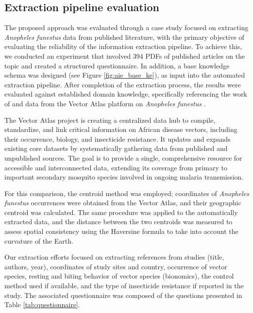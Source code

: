 \documentclass{article}
\begin{document}
\subsection{Extraction pipeline evaluation}
\par 
The proposed approach was evaluated through a case study focused on extracting \textit{Anopheles funestus} data from published literature, with the primary objective of evaluating the reliability of the information extraction pipeline. 
To achieve this, we conducted an experiment that involved 394 PDFs of published articles on the topic and created a structured questionnaire. 
In addition, a base knowledge schema was designed (see Figure \ref{fig:aie_base_ke}), as input into the automated extraction pipeline. 
After completion of the extraction process, the results were evaluated against established domain knowledge, specifically referencing the work of \citep{2012.ME.AGM} and data from the Vector Atlas platform on \textit{Anopheles funestus} \citep{2025.VE.VAP}. 
\par
The Vector Atlas project is creating a centralized data hub to compile, standardize, and link critical information on African disease vectors, including their occurrence, biology, and insecticide resistance. It updates and expands existing core datasets by systematically gathering data from published and unpublished sources. 
The goal is to provide a single, comprehensive resource for accessible and interconnected data, extending its coverage from primary to important secondary mosquito species involved in ongoing malaria transmission.
\par
For this comparison, the centroid method was employed; coordinates of \textit{Anopheles funestus} occurrences were obtained from the Vector Atlas, and their geographic centroid was calculated. 
The same procedure was applied to the automatically extracted data, and the distance between the two centroids was measured to assess spatial consistency using the Haversine formula \citep{2013.NR.LBS} to take into account the curvature of the Earth.
\par 
Our extraction efforts focused on extracting references from studies (title, authors, year), coordinates of study sites and country, occurrence of vector species, resting and biting behavior of vector species (bionomics), the control method used if available, and the type of insecticide resistance if reported in the study. 
The associated questionnaire was composed of the questions presented in Table \ref{tab:questionnaire}.
\par
\end{document}
